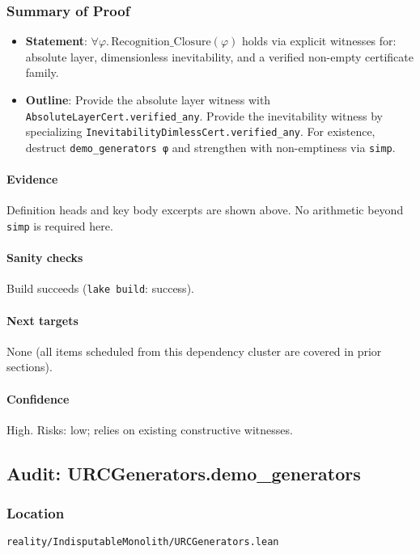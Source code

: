 \documentclass{article}
\newcommand{\FileRef}[1]{\texttt{#1}}
\begin{document}
\subsubsection{Summary of Proof}
\begin{itemize}[leftmargin=*]
  \item \textbf{Statement}: \(\forall φ.\,\mathrm{Recognition\_Closure}(φ)\) holds via explicit witnesses for: absolute layer, dimensionless inevitability, and a verified non-empty certificate family.
  \item \textbf{Outline}: Provide the absolute layer witness with \texttt{AbsoluteLayerCert.verified\_any}. Provide the inevitability witness by specializing \texttt{InevitabilityDimlessCert.verified\_any}. For existence, destruct \texttt{demo\_generators φ} and strengthen with non-emptiness via \texttt{simp}.
\end{itemize}

\paragraph{Evidence}
Definition heads and key body excerpts are shown above. No arithmetic beyond \texttt{simp} is required here.

\paragraph{Sanity checks}
Build succeeds (\texttt{lake build}: success).

\paragraph{Next targets} None (all items scheduled from this dependency cluster are covered in prior sections).

\paragraph{Confidence} High. Risks: low; relies on existing constructive witnesses.

\subsection{Audit: URCGenerators.demo\_generators}
\subsubsection{Location}
\FileRef{reality/IndisputableMonolith/URCGenerators.lean}
\end{document}

